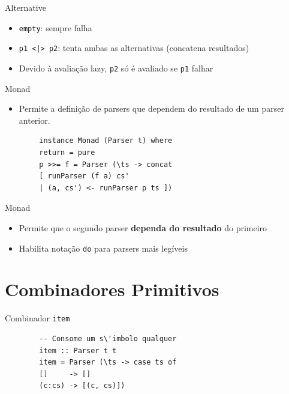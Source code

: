 \begin{frame}[fragile]{Alternative}

    \begin{itemize}

        \item
        \texttt{empty}: sempre falha
        \item
        \texttt{p1 <|> p2}: tenta ambas as alternativas
        (concatena resultados)
        \item
        Devido à avaliação lazy, \texttt{p2} só é avaliado se
        \texttt{p1} falhar
    \end{itemize}
\end{frame}

\begin{frame}[fragile]{Monad}

    \begin{itemize}

        \item
        Permite a definição de parsers que dependem do resultado de um parser
        anterior.
    \end{itemize}

    \begin{lstlisting}
        instance Monad (Parser t) where
        return = pure
        p >>= f = Parser (\ts -> concat
        [ runParser (f a) cs'
        | (a, cs') <- runParser p ts ])
    \end{lstlisting}
\end{frame}

\begin{frame}[fragile]{Monad}

    \begin{itemize}

        \item
        Permite que o segundo parser \textbf{dependa do resultado} do primeiro
        \item
        Habilita notação \texttt{do} para parsers mais
        legíveis
    \end{itemize}
\end{frame}


\section{Combinadores Primitivos}\label{combinadores-primitivos}

\begin{frame}[fragile]{Combinador \texttt{item}}

    \begin{lstlisting}
        -- Consome um s\'imbolo qualquer
        item :: Parser t t
        item = Parser (\ts -> case ts of
        []     -> []
        (c:cs) -> [(c, cs)])
    \end{lstlisting}
\end{frame}

